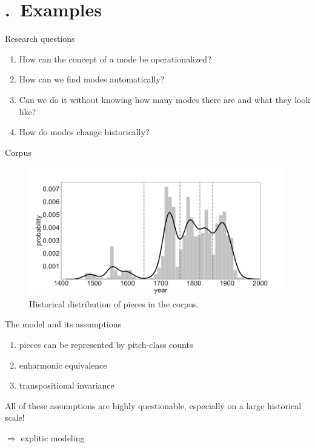 \section{\thesection.~Examples}

\begin{frame}{}
\end{frame}

\begin{frame}{Research questions}
    \begin{enumerate}
        \item How can the concept of a mode be operationalized? 
        \item How can we find modes automatically? 
        \item Can we do it without knowing how many modes there are and what they look like?
        \item How do modes change historically?
    \end{enumerate}
\end{frame}

\begin{frame}{Corpus}
    \begin{figure}
        \includegraphics[width=\linewidth,height=.8\textheight,keepaspectratio]{img/Figure1.pdf}
        \caption{Historical distribution of pieces in the corpus.}
        \label{fig:piece_dist}
    \end{figure}
\end{frame}

\begin{frame}{The model and its assumptions}
    \begin{enumerate}
        \item pieces can be represented by pitch-class counts
        \item enharmonic equivalence
        \item transpositional invariance
    \end{enumerate}

    \pause
    
    All of these assumptions are highly questionable, especially on a large historical scale!
    
    \pause
    
    $\Longrightarrow$ explitic modeling
\end{frame}

